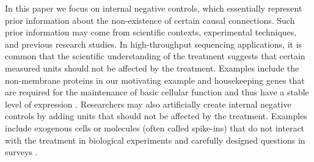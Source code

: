 \documentclass[a4paper,11pt]{article}
\theoremstyle{plain}
\theoremstyle{definition}
\theoremstyle{plain}
\begin{document}

In this paper we focus on internal negative controls, which
essentially represent prior information
about the non-existence of certain causal connections. Such prior
information may come from scientific contexts, experimental
techniques, and previous research studies. In high-throughput
sequencing applications, it is common that the scientific
understanding of the treatment suggests that certain measured units
should not be affected by the treatment. Examples include the
non-membrane proteins in our motivating example \parencite{li2020cell,
  shuster2022situ} and housekeeping genes that are required for the
maintenance of basic cellular function
and thus have a stable level of expression
\parencite{gagnon2012using}. Researchers may also artificially create
internal negative controls by adding units that
should not be affected by the treatment. Examples
include exogenous cells or molecules (often called spike-ins) that do
not interact with the treatment in biological experiments
\parencite{lippa2010exploring} and carefully designed questions in surveys
\parencite{lipsitch2010negative}.

\end{document}
